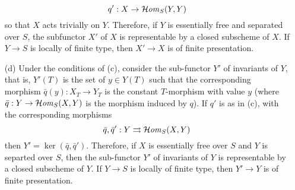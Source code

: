 \begin{example}
\begin{enumerate}
    \[q':X\to\operatorname{\mathcal{H}\hspace*{-0.4pt}\textit{om}\hspace{0.5pt}}_S(Y,Y)\]
    so that $X$ acts trivially on $Y$. Therefore, if $Y$ is essentially free and separated over $S$, the subfunctor $X'$ of $X$ is representable by a closed subscheme of $X$. If $Y\to S$ is locally of finite type, then $X'\to X$ is of finite presentation.
    \item[(d)] Under the conditions of (c), consider the sub-functor $Y'$ of invariants of $Y$, that is, $Y'(T)$ is the set of $y\in Y(T)$ such that the corresponding morphism $\bar{q}(y):X_T\to Y_T$ is the constant $T$-morphism with value $y$ (where $\bar{q}:Y\to\operatorname{\mathcal{H}\hspace*{-0.4pt}\textit{om}\hspace{0.5pt}}_S(X,Y)$ is the morphism induced by $q$). If $q'$ is as in (c), with the corresponding morphisms
    \[\bar{q},\bar{q}':Y\rightrightarrows\operatorname{\mathcal{H}\hspace*{-0.4pt}\textit{om}\hspace{0.5pt}}_S(X,Y)\]
    then $Y'=\ker(\bar{q},\bar{q}')$. Therefore, if $X$ is essentially free over $S$ and $Y$ is separted over $S$, then the sub-functor $Y'$ of invariants of $Y$ is representable by a closed subscheme of $Y$. If $Y\to S$ is locally of finite type, then $Y'\to Y$ is of finite presentation.
\end{enumerate}
\end{example}

